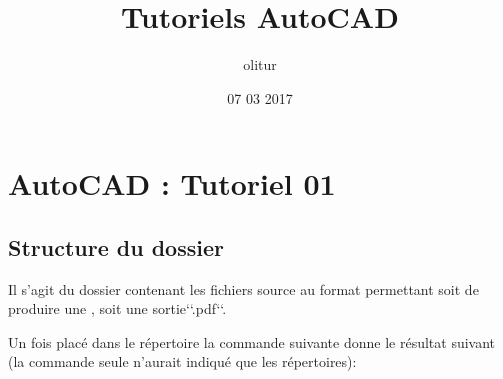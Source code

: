 \documentclass[a4paper,10pt,french]{sphinxmanual}
\title{Tutoriels AutoCAD}
\date{07 03 2017}
\author{olitur}
\begin{document}
\maketitle
\sphinxtableofcontents
{}\label{\detokenize{docs/tuts/index::doc}}



\chapter{AutoCAD : Tutoriel 01}
\label{\detokenize{docs/tuts/autocad-tut01:tutoriels-acad}}\label{\detokenize{docs/tuts/autocad-tut01::doc}}\label{\detokenize{docs/tuts/autocad-tut01:autocad-tutoriel-01}}\label{\detokenize{docs/tuts/autocad-tut01:acad-tuts}}\label{\detokenize{docs/tuts/autocad-tut01:autocad-tut01}}

\section{Structure du dossier }
\label{\detokenize{docs/tuts/autocad-tut01:structure-du-dossier-docs}}
Il s'agit du dossier contenant les fichiers source au format  permettant soit de produire une  , soit une sortie{}`{}`.pdf{}`{}`.

Un fois placé dans le répertoire  la commande suivante  donne le résultat suivant (la commande  seule n'aurait indiqué que les répertoires):
\end{document}
